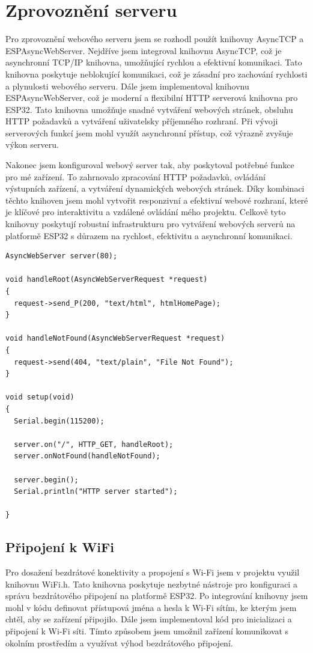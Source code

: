 \documentclass[12pt, a4paper,
oneside
openany
]{report}
\begin{document}
\section{Zprovoznění serveru}
\noindent Pro zprovoznění webového serveru jsem se rozhodl použít knihovny AsyncTCP a ESPAsyncWebServer. Nejdříve jsem integroval knihovnu AsyncTCP, což je asynchronní TCP/IP knihovna, umožňující rychlou a efektivní komunikaci. Tato knihovna poskytuje neblokující komunikaci, což je zásadní pro zachování rychlosti a plynulosti webového serveru.
Dále jsem implementoval knihovnu ESPAsyncWebServer, což je moderní a flexibilní HTTP serverová knihovna pro ESP32. Tato knihovna umožňuje snadné vytváření webových stránek, obsluhu HTTP požadavků a vytváření uživatelsky příjemného rozhraní. Při vývoji serverových funkcí jsem mohl využít asynchronní přístup, což výrazně zvyšuje výkon serveru.

\noindent Nakonec jsem konfiguroval webový server tak, aby poskytoval potřebné funkce pro mé zařízení. To zahrnovalo zpracování HTTP požadavků, ovládání výstupních zařízení, a vytváření dynamických webových stránek. Díky kombinaci těchto knihoven jsem mohl vytvořit responzivní a efektivní webové rozhraní, které je klíčové pro interaktivitu a vzdálené ovládání mého projektu. Celkově tyto knihovny poskytují robustní infrastrukturu pro vytváření webových serverů na platformě ESP32 s důrazem na rychlost, efektivitu a asynchronní komunikaci.

\newpage
 \begin{lstlisting}[style=arduinoStyle]
AsyncWebServer server(80);

void handleRoot(AsyncWebServerRequest *request)
{
  request->send_P(200, "text/html", htmlHomePage);
}

void handleNotFound(AsyncWebServerRequest *request)
{
  request->send(404, "text/plain", "File Not Found");
}

void setup(void)
{
  Serial.begin(115200);

  server.on("/", HTTP_GET, handleRoot);
  server.onNotFound(handleNotFound);

  server.begin();
  Serial.println("HTTP server started");

}
\end{lstlisting}

 \newpage
 
\subsection{Připojení k WiFi}
\noindent Pro dosažení bezdrátové konektivity a propojení s Wi-Fi jsem v projektu využil knihovnu WiFi.h. Tato knihovna poskytuje nezbytné nástroje pro konfiguraci a správu bezdrátového připojení na platformě ESP32. Po integrování knihovny jsem mohl v kódu definovat přístupová jména a hesla k Wi-Fi sítím, ke kterým jsem chtěl, aby se zařízení připojilo. Dále jsem implementoval kód pro inicializaci a připojení k Wi-Fi síti. Tímto způsobem jsem umožnil zařízení komunikovat s okolním prostředím a využívat výhod bezdrátového připojení. 
\end{document}
